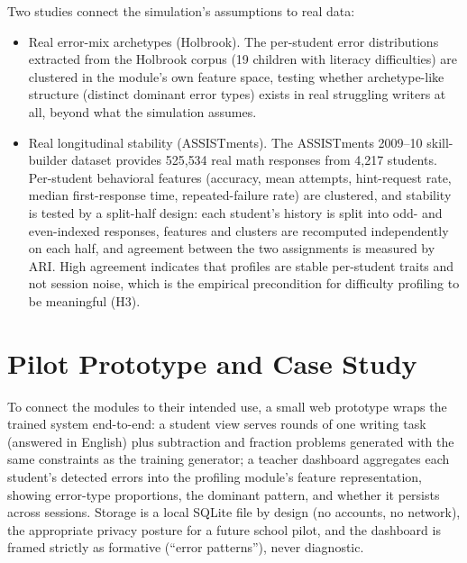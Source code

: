 Two studies connect the simulation's assumptions to real data:

\begin{itemize}
    \item Real error-mix archetypes (Holbrook). The per-student error distributions extracted from the Holbrook corpus (19 children with literacy difficulties) are clustered in the module's own feature space, testing whether archetype-like structure (distinct dominant error types) exists in real struggling writers at all, beyond what the simulation assumes.
    \item Real longitudinal stability (ASSISTments). The ASSISTments 2009--10 skill-builder dataset \parencite{Feng2009Assistments} provides 525{,}534 real math responses from 4{,}217 students. Per-student behavioral features (accuracy, mean attempts, hint-request rate, median first-response time, repeated-failure rate) are clustered, and stability is tested by a split-half design: each student's history is split into odd- and even-indexed responses, features and clusters are recomputed independently on each half, and agreement between the two assignments is measured by ARI. High agreement indicates that profiles are stable per-student traits and not session noise, which is the empirical precondition for difficulty profiling to be meaningful (H3).
\end{itemize}

\section{Pilot Prototype and Case Study}
\label{sec:impl_prototype}

To connect the modules to their intended use, a small web prototype wraps the trained system end-to-end: a student view serves rounds of one writing task (answered in English) plus subtraction and fraction problems generated with the same constraints as the training generator; a teacher dashboard aggregates each student's detected errors into the profiling module's feature representation, showing error-type proportions, the dominant pattern, and whether it persists across sessions. Storage is a local SQLite file by design (no accounts, no network), the appropriate privacy posture for a future school pilot, and the dashboard is framed strictly as formative (``error patterns''), never diagnostic.

